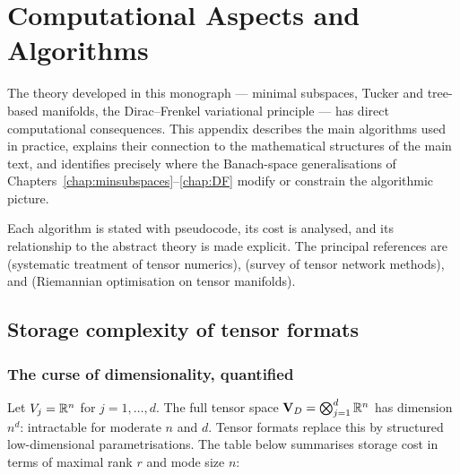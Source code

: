 %

\chapter{Computational Aspects and Algorithms}
\label{app:algorithms}

The theory developed in this monograph --- minimal subspaces, Tucker
and tree-based manifolds, the Dirac--Frenkel variational principle ---
has direct computational consequences. This appendix describes the
main algorithms used in practice, explains their connection to the
mathematical structures of the main text, and identifies precisely
where the Banach-space generalisations of
Chapters~\ref{chap:minsubspaces}--\ref{chap:DF} modify or constrain
the algorithmic picture.

Each algorithm is stated with pseudocode, its cost is analysed, and
its relationship to the abstract theory is made explicit. The principal
references are~\cite{Hackbusch2019} (systematic treatment of tensor
numerics), \cite{Bachmayr2016} (survey of tensor network methods), and
\cite{UschmajewVandereycken2020} (Riemannian optimisation on tensor
manifolds).

\section{Storage complexity of tensor formats}
\label{app:alg:storage}

\subsection*{The curse of dimensionality, quantified}

Let $V_j = \mathbb{R}^n$ for $j = 1, \ldots, d$. The full tensor space
$\mathbf{V}_D = \bigotimes_{j=1}^d \mathbb{R}^n$ has dimension $n^d$: intractable
for moderate $n$ and $d$. Tensor formats replace this by structured
low-dimensional parametrisations. The table below summarises storage
cost in terms of maximal rank $r$ and mode size $n$:

